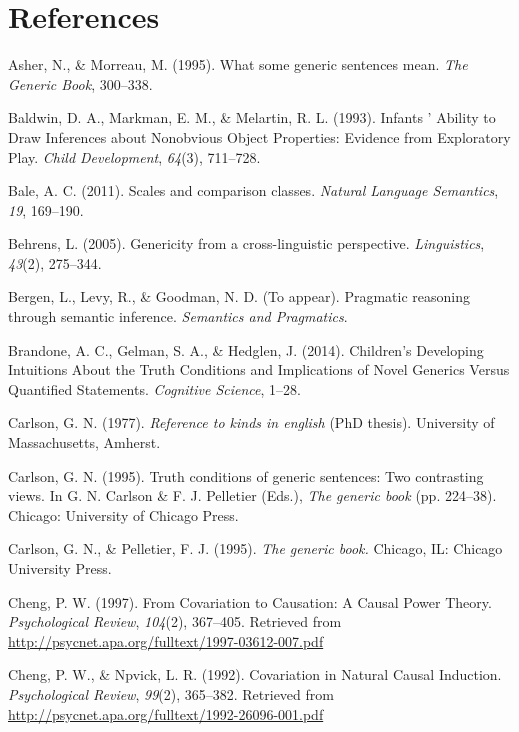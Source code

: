 \documentclass[english,floatsintext,man]{apa6}
\theoremstyle{definition}
\theoremstyle{definition}
\theoremstyle{definition}
\theoremstyle{remark}
\begin{document}
\section{References}\label{references}

\hypertarget{refs}{}
\hypertarget{ref-Asher1995}{}
Asher, N., \& Morreau, M. (1995). What some generic sentences mean.
\emph{The Generic Book}, 300--338.

\hypertarget{ref-Baldwin1993}{}
Baldwin, D. A., Markman, E. M., \& Melartin, R. L. (1993). Infants '
Ability to Draw Inferences about Nonobvious Object Properties: Evidence
from Exploratory Play. \emph{Child Development}, \emph{64}(3), 711--728.

\hypertarget{ref-Bale2011}{}
Bale, A. C. (2011). Scales and comparison classes. \emph{Natural
Language Semantics}, \emph{19}, 169--190.

\hypertarget{ref-Behrens2005}{}
Behrens, L. (2005). Genericity from a cross-linguistic perspective.
\emph{Linguistics}, \emph{43}(2), 275--344.

\hypertarget{ref-Bergen2016}{}
Bergen, L., Levy, R., \& Goodman, N. D. (To appear). Pragmatic reasoning
through semantic inference. \emph{Semantics and Pragmatics}.

\hypertarget{ref-Brandone2014}{}
Brandone, A. C., Gelman, S. A., \& Hedglen, J. (2014). Children's
Developing Intuitions About the Truth Conditions and Implications of
Novel Generics Versus Quantified Statements. \emph{Cognitive Science},
1--28.

\hypertarget{ref-Carlson1977}{}
Carlson, G. N. (1977). \emph{Reference to kinds in english}
(PhD thesis). University of Massachusetts, Amherst.

\hypertarget{ref-Carlson1995essay}{}
Carlson, G. N. (1995). Truth conditions of generic sentences: Two
contrasting views. In G. N. Carlson \& F. J. Pelletier (Eds.), \emph{The
generic book} (pp. 224--38). Chicago: University of Chicago Press.

\hypertarget{ref-Carlson1995}{}
Carlson, G. N., \& Pelletier, F. J. (1995). \emph{The generic book.}
Chicago, IL: Chicago University Press.

\hypertarget{ref-Cheng1997}{}
Cheng, P. W. (1997). From Covariation to Causation: A Causal Power
Theory. \emph{Psychological Review}, \emph{104}(2), 367--405. Retrieved
from \url{http://psycnet.apa.org/fulltext/1997-03612-007.pdf}

\hypertarget{ref-Cheng1992}{}
Cheng, P. W., \& Npvick, L. R. (1992). Covariation in Natural Causal
Induction. \emph{Psychological Review}, \emph{99}(2), 365--382.
Retrieved from \url{http://psycnet.apa.org/fulltext/1992-26096-001.pdf}
\end{document}
